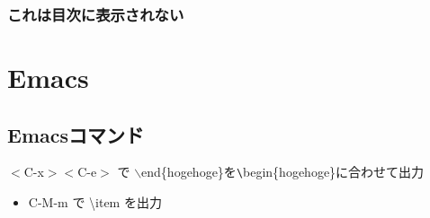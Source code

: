 \documentclass{jsarticle}
\begin{document}
\subsubsection{これは目次に表示されない}

\hoge %




\newpage %

\thispagestyle{empty} %

\section{Emacs}
\subsection{Emacsコマンド}
$< $C-x$>< $C-e$>$ で $\backslash $end\{hogehoge\}を\verb|\|begin\{hogehoge\}に合わせて出力

\begin{itemize}
\item C-M-m で \textbackslash item を出力
\end{itemize}

\clearpage %

\end{document}
